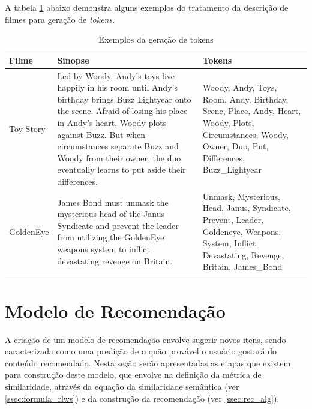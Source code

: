 A tabela \ref{tab:nlp_example} abaixo demonstra alguns exemplos do tratamento da descrição de filmes para geração de \textit{tokens}. 

\begin{table}[]
	\centering
	\caption{Exemplos da geração de tokens}
	\def\arraystretch{1.3} %
	\begin{tabular}{|p{2cm}|p{6cm}|p{6cm}|}
	\hline
	\textbf{Filme} & \textbf{Sinopse} & \textbf{Tokens} \\ \hline
	Toy Story & Led by Woody, Andy's toys live happily in his room until Andy's birthday brings Buzz Lightyear onto the scene. Afraid of losing his place in Andy's heart, Woody plots against Buzz. But when circumstances separate Buzz and Woody from their owner, the duo eventually learns to put aside their differences.& Woody, Andy, Toys, Room, Andy, Birthday, Scene, Place, Andy, Heart, Woody, Plots, Circumstances, Woody, Owner, Duo, Put, Differences, Buzz\_Lightyear \\ \hline
	GoldenEye & James Bond must unmask the mysterious head of the Janus Syndicate and prevent the leader from utilizing the GoldenEye weapons system to inflict devastating revenge on Britain. & Unmask, Mysterious, Head, Janus, Syndicate, Prevent, Leader, Goldeneye, Weapons, System, Inflict, Devastating, Revenge, Britain, James\_Bond \\ \hline
	\end{tabular}
\label{tab:nlp_example}
\end{table}

\section{Modelo de Recomendação}
\label{ssec:sim_rec}

A criação de um modelo de recomendação envolve sugerir novos itens, sendo caracterizada como uma predição de o quão provável o usuário gostará do conteúdo recomendado. Nesta seção serão apresentadas as etapas que existem para construção deste modelo, que envolve na definição da métrica de similaridade, através da equação da similaridade semântica (ver \ref{ssec:formula_rlws}) e da construção da recomendação (ver \ref{ssec:rec_alg}).

